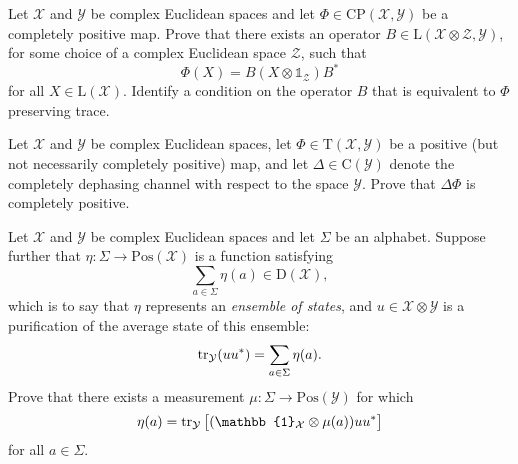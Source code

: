 \documentclass[boxes,pages,color=SeaGreen]{homework}
\newcommand{\I}{\mathbb{1}}
\newcommand{\X}{\mathcal{X}}
\newcommand{\Y}{\mathcal{Y}}
\newcommand{\Z}{\mathcal{Z}}
\newcommand{\Lin}{\mathrm{L}}
\newcommand{\Trans}{\mathrm{T}}
\newcommand{\Pos}{\mathrm{Pos}}
\newcommand{\Channel}{\mathrm{C}}
\newcommand{\Density}{\mathrm{D}}
\newcommand{\CP}{\mathrm{CP}}
\begin{document}
\begin{problem}
Let $\X$ and $\Y$ be complex Euclidean spaces and let
$\Phi\in\CP(\X,\Y)$ be a completely positive map.
Prove that there exists an operator $B\in\Lin(\X\otimes\Z,\Y)$, for some
choice of a complex Euclidean space $\Z$, such that
\[
    \Phi(X) = B (X \otimes \I_{\Z}) B^{\ast}
\]
for all $X\in\Lin(\X)$.
Identify a condition on the operator $B$ that is equivalent to $\Phi$
preserving trace.
\end{problem}

\begin{solution}
\end{solution}


\begin{problem}
Let $\X$ and $\Y$ be complex Euclidean spaces, let $\Phi\in\Trans(\X,\Y)$
be a positive (but not necessarily completely positive) map, and let
$\Delta\in\Channel(\Y)$ denote the completely dephasing channel with
respect to the space $\Y$.
Prove that $\Delta\Phi$ is completely positive.
\end{problem}

\begin{solution}
\end{solution}


\begin{problem}
Let $\X$ and $\Y$ be complex Euclidean spaces and let $\Sigma$ be an
alphabet.
Suppose further that $\eta:\Sigma\rightarrow\Pos(\X)$ is a function
satisfying
\[
    \sum_{a\in\Sigma} \eta(a) \in \Density(\X),
\]
which is to say that $\eta$ represents an \emph{ensemble of states},
and $u\in\X\otimes\Y$ is a purification of the average state of this
ensemble:
\[
    \tr_{\Y}( u u^{\ast} ) = \sum_{a\in\Sigma} \eta(a).
\]
Prove that there exists a measurement $\mu:\Sigma\rightarrow\Pos(\Y)$ for
which
\[
    \eta(a) = \tr_{\Y} \qty\big[(\I_{\X}\otimes\mu(a))u u^{\ast}]
\]
for all $a\in\Sigma$.
\end{problem}

\begin{solution}
\end{solution}

\end{document}
